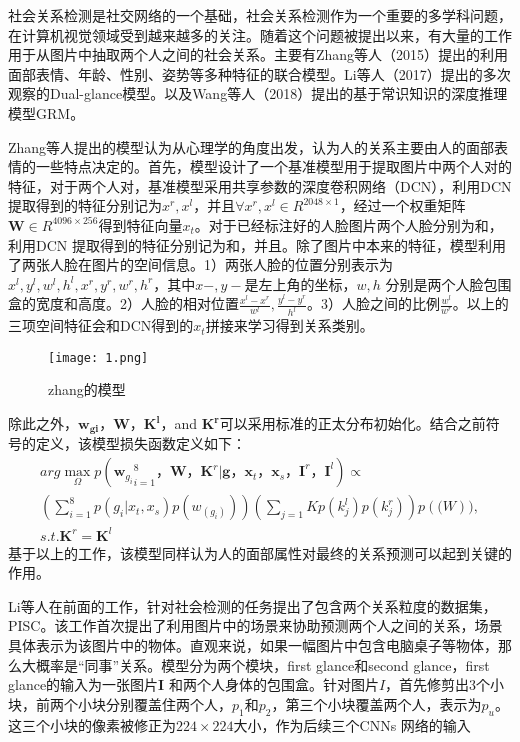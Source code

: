 社会关系检测是社交网络的一个基础，社会关系检测作为一个重要的多学科问题，在计算机视觉领域受到越来越多的关注。随着这个问题被提出以来，有大量的工作用于从图片中抽取两个人之间的社会关系。主要有Zhang等人（2015）\cite{DBLP:conf/iccv/ZhangLLT15}提出的利用面部表情、年龄、性别、姿势等多种特征的联合模型。Li等人（2017）\cite{DBLP:conf/iccv/LiWZK17}提出的多次观察的Dual-glance模型。以及Wang等人（2018）\cite{DBLP:conf/ijcai/WangCRYCL18}提出的基于常识知识的深度推理模型GRM。

Zhang等人提出的模型认为从心理学的角度出发，认为人的关系主要由人的面部表情的一些特点决定的。首先，模型设计了一个基准模型用于提取图片中两个人对的特征，对于两个人对，基准模型采用共享参数的深度卷积网络（DCN），利用DCN提取得到的特征分别记为$x^r,x^l$，并且$\forall x^r,x^l \in R^{2048 \times 1}$，经过一个权重矩阵$\mathbf{W} \in R^{4096 \times 256}$得到特征向量$x_t$。对于已经标注好的人脸图片两个人脸分别为和，利用DCN 提取得到的特征分别记为和，并且。除了图片中本来的特征，模型利用了两张人脸在图片的空间信息。1）两张人脸的位置分别表示为${x^l,y^l,w^l,h^l,x^r,y^r,w^r,h^r}$，其中$x-,y-$是左上角的坐标，$w,h$ 分别是两个人脸包围盒的宽度和高度。2）人脸的相对位置$\frac{x^l-x^r}{w^l},\frac{y^l-y^r}{h^l}$。3）人脸之间的比例$\frac{w^l}{w^r}$。以上的三项空间特征会和DCN得到的$x_t$拼接来学习得到关系类别。
\begin{figure}[htpb]
	\centering
	\texttt{[image: 1.png]}
    \caption{zhang的模型}
	\vspace*{-3.5mm}
	\label{fig:model_zhang}
\end{figure}
除此之外，$\mathbf{w_{gi}}$，$\mathbf{W}$，$\mathbf{K^l}$，and $\mathbf{K^r}$可以采用标准的正太分布初始化。结合之前符号的定义，该模型损失函数定义如下：
\begin{equation}
\begin{split}
     arg\max \limits_{\Omega} p({\mathbf{w}_{g_i}}_{i=1}^8， \mathbf{W}，\mathbf{K}^r | \mathbf{g}，\mathbf{x}_t，\mathbf{x}_s，\mathbf{I}^r，\mathbf{I}^l) \propto \\
     (\sum_{i=1}^{8}p(g_i|x_t,x_s)p(w_(g_i)))(\sum_{j=1}{K}p(k_j^l)p(k_j^r))p(\mathbf(W)), \\
     s.t. \mathbf{K}^r = \mathbf{K}^l
\end{split}
\end{equation}
基于以上的工作，该模型同样认为人的面部属性对最终的关系预测可以起到关键的作用。

Li等人\cite{DBLP:conf/iccv/LiWZK17}在前面的工作，针对社会检测的任务提出了包含两个关系粒度的数据集，PISC\cite{DBLP:conf/iccv/LiWZK17}。该工作首次提出了利用图片中的场景来协助预测两个人之间的关系，场景具体表示为该图片中的物体。直观来说，如果一幅图片中包含电脑桌子等物体，那么大概率是``同事''关系。模型分为两个模块，first glance和second glance，first glance的输入为一张图片$\mathbf{I}$ 和两个人身体的包围盒。针对图片$I$，首先修剪出3个小块，前两个小块分别覆盖住两个人，$p_1$和$p_2$，第三个小块覆盖两个人，表示为$p_{u}$。这三个小块的像素被修正为$224 \times 224$大小，作为后续三个CNNs 网络的输入

